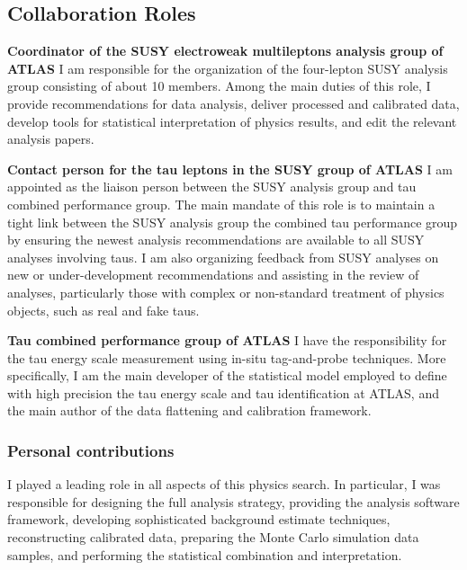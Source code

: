 \subsection*{Collaboration Roles}

\textbf{Coordinator of the SUSY electroweak multileptons analysis group of ATLAS}\newline
I am responsible for the organization of the four-lepton SUSY analysis group consisting of about 10 members.  Among the main duties of this role, I provide recommendations for data analysis, deliver processed and calibrated data, develop tools for statistical interpretation of physics results, and edit the relevant analysis papers.
\newline

\noindent
\textbf{Contact person for the tau leptons in the SUSY group of ATLAS}\newline
I am appointed as the liaison person between the SUSY analysis group and tau combined performance group. The main mandate of this role is to maintain a tight link between the SUSY analysis group the combined tau performance group by ensuring the newest analysis recommendations are available to all SUSY analyses involving taus. I am also organizing feedback from SUSY analyses on new or under-development recommendations and assisting in the review of analyses, particularly those with complex or non-standard treatment of physics objects, such as real and fake taus.
\newline

\noindent
\textbf{Tau combined performance group of ATLAS}\newline
I have the responsibility for the tau energy scale measurement using in-situ tag-and-probe techniques. More specifically, I am the main developer of the statistical model employed to define with high precision the tau energy scale and tau identification at ATLAS, and the main author of the data flattening and calibration framework.

\subsubsection*{Personal contributions}
I played a leading role in all aspects of this physics search. In particular, I was responsible for designing the full analysis strategy, providing the analysis software framework, developing sophisticated background estimate techniques, reconstructing calibrated data, preparing the Monte Carlo simulation data samples, and performing the statistical combination and interpretation. 

